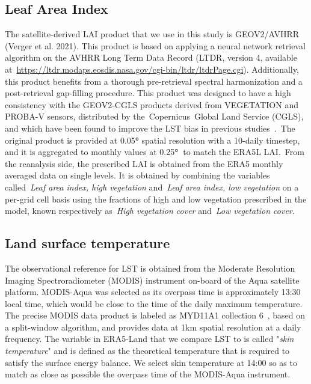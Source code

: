 \documentclass[gmd, manuscript]{copernicus}
\begin{document}
\subsection{Leaf Area Index}

The satellite-derived LAI product that we use in this study is
GEOV2/AVHRR (Verger et al. 2021). This product is based on applying a
neural network retrieval algorithm on the AVHRR Long Term Data Record
(LTDR, version 4, available
at~\url{https://ltdr.modaps.eosdis.nasa.gov/cgi-bin/ltdr/ltdrPage.cgi}).
Additionally, this product benefits from a thorough pre-retrieval
spectral harmonization and a post-retrieval gap-filling procedure. This
product was designed to have a high consistency with the GEOV2-CGLS
products derived from VEGETATION and PROBA-V sensors, distributed by
the~Copernicus~Global Land Service (CGLS), and which have been found to
improve the LST bias in previous studies~\citep{Nogueira_2020,Nogueira_2021}.~The
original product is provided at 0.05\textbf{°} spatial resolution with a
10-daily timestep, and it is aggregated to monthly values at
0.25\textbf{°~}to match the ERA5L LAI.~{From the reanalysis side, the
prescribed LAI is obtained from the ERA5 monthly averaged data on single
levels.} It is obtained by combining the variables called~\emph{{Leaf}
area index, high vegetation} and~\emph{Leaf area index, low vegetation}
on a per-grid cell basis using the fractions of high and low vegetation
prescribed in the model, known respectively as~\emph{High vegetation
cover} and~\emph{Low vegetation cover}.~


\subsection{Land surface temperature}

The observational reference for LST is obtained from the Moderate
Resolution Imaging Spectroradiometer (MODIS) instrument on-board of the
Aqua satellite platform. MODIS-Aqua was selected as its overpass time is
approximately 13:30 local time, which would be close to the time of the
daily maximum temperature. The precise MODIS data product is labeled as
MYD11A1 collection 6~\citep{Wan_2015}, based on a split-window
algorithm, and provides data at 1km spatial resolution at a daily
frequency. The variable in ERA5-Land that we compare LST to is called
"\emph{skin temperature}" and is defined as the theoretical temperature
that is required to satisfy the surface energy balance. We select skin
temperature at 14:00 so as to match as close as possible the overpass
time of the MODIS-Aqua instrument.~
\end{document}
